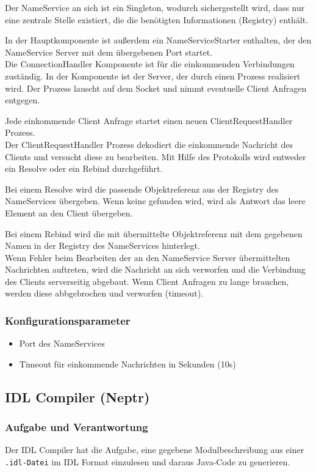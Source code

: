 \documentclass{article}
\begin{document}
Der NameService an sich ist ein Singleton, wodurch sichergestellt wird, dass nur eine zentrale Stelle existiert, die
die benötigten Informationen (Registry) enthält.

In der Hauptkomponente ist außerdem ein NameServiceStarter enthalten, der den NameService Server mit dem übergebenen
Port startet.\\

Die ConnectionHandler Komponente ist für die einkommenden Verbindungen zuständig. In der Komponente ist der Server, der
durch einen Prozess realisiert wird. Der Prozess lauscht auf dem Socket und nimmt eventuelle Client Anfragen entgegen.

Jede einkommende Client Anfrage startet einen neuen ClientRequestHandler Prozess.\\

Der ClientRequestHandler Prozess dekodiert die einkommende Nachricht des Clients und versucht diese zu bearbeiten.
Mit Hilfe des Protokolls wird entweder ein Resolve oder ein Rebind durchgeführt.

Bei einem Resolve wird die passende Objektreferenz aus der Registry des NameServices übergeben. Wenn keine gefunden
wird, wird als Antwort das leere Element an den Client übergeben.

Bei einem Rebind wird die mit übermittelte Objektreferenz mit dem gegebenen Namen in der Registry des NameServices
hinterlegt.\\

Wenn Fehler beim Bearbeiten der an den NameService Server übermittelten Nachrichten auftreten, wird die Nachricht an
sich verworfen und die Verbindung des Clients serverseitig abgebaut. Wenn Client Anfragen zu lange brauchen, werden
diese abbgebrochen und verworfen (timeout).

\subsubsection{Konfigurationsparameter}
\begin{itemize}
    \item Port des NameServices
    \item Timeout für einkommende Nachrichten in Sekunden (10s)
\end{itemize}

\subsection{IDL Compiler (Neptr)}
\subsubsection{Aufgabe und Verantwortung}
Der IDL Compiler hat die Aufgabe, eine gegebene Modulbeschreibung aus einer \texttt{.idl-Datei} im IDL Format einzulesen
und daraus Java-Code zu generieren.\\
\end{document}
